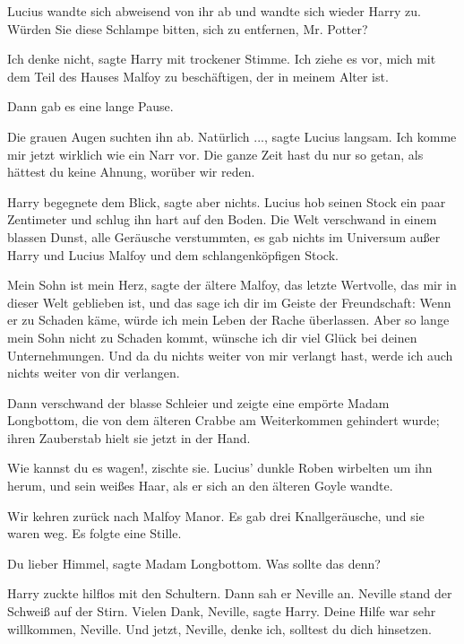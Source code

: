 Lucius wandte sich abweisend von ihr ab und wandte sich wieder Harry zu. \glqq{}
Würden Sie diese Schlampe bitten, sich zu entfernen, Mr. Potter?\grqq{}

\glqq{}Ich denke nicht\grqq{}, sagte Harry mit trockener Stimme. \glqq{}Ich
ziehe es vor, mich mit dem Teil des Hauses Malfoy zu beschäftigen, der in meinem
Alter ist.\grqq{}

Dann gab es eine lange Pause.

Die grauen Augen suchten ihn ab. \glqq{}Natürlich ...\grqq{}, sagte Lucius
langsam. \glqq{}Ich komme mir jetzt wirklich wie ein Narr vor. Die ganze Zeit
hast du nur so getan, als hättest du keine Ahnung, worüber wir reden.\grqq{}

Harry begegnete dem Blick, sagte aber nichts. Lucius hob seinen Stock ein paar
Zentimeter und schlug ihn hart auf den Boden. Die Welt verschwand in einem
blassen Dunst, alle Geräusche verstummten, es gab nichts im Universum außer
Harry und Lucius Malfoy und dem schlangenköpfigen Stock.

\glqq{}Mein Sohn ist mein Herz\grqq{}, sagte der ältere Malfoy, \glqq{}das
letzte Wertvolle, das mir in dieser Welt geblieben ist, und das sage ich dir im
Geiste der Freundschaft: Wenn er zu Schaden käme, würde ich mein Leben der Rache
überlassen. Aber so lange mein Sohn nicht zu Schaden kommt, wünsche ich dir viel
Glück bei deinen Unternehmungen. Und da du nichts weiter von mir verlangt hast,
werde ich auch nichts weiter von dir verlangen.\grqq{}

Dann verschwand der blasse Schleier und zeigte eine empörte Madam Longbottom,
die von dem älteren Crabbe am Weiterkommen gehindert wurde; ihren Zauberstab
hielt sie jetzt in der Hand.

\glqq{}Wie kannst du es wagen!\grqq{}, zischte sie. Lucius' dunkle Roben
wirbelten um ihn herum, und sein weißes Haar, als er sich an den älteren Goyle
wandte.

\glqq{}Wir kehren zurück nach Malfoy Manor.\grqq{} Es gab drei Knallgeräusche, und sie
waren weg. Es folgte eine Stille.

\glqq{}Du lieber Himmel\grqq{}, sagte Madam Longbottom. \glqq{}Was sollte das
denn?\grqq{}

Harry zuckte hilflos mit den Schultern. Dann sah er Neville an. Neville stand
der Schweiß auf der Stirn. \glqq{}Vielen Dank, Neville\grqq{}, sagte Harry.
\glqq{}Deine Hilfe war sehr willkommen, Neville. Und jetzt, Neville, denke ich,
solltest du dich hinsetzen.\grqq{}

